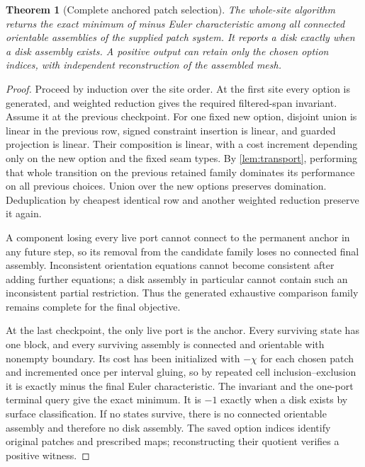 \documentclass[11pt,letterpaper]{article}
\newtheorem{theorem}{Theorem}[section]
\theoremstyle{definition}
\begin{document}
\begin{theorem}[Complete anchored patch selection]\label{thm:patch-algorithm}
The whole-site algorithm returns the exact minimum of minus Euler characteristic among all connected orientable assemblies of the supplied patch system. It reports a disk exactly when a disk assembly exists. A positive output can retain only the chosen option indices, with independent reconstruction of the assembled mesh.
\end{theorem}
\begin{proof}
Proceed by induction over the site order. At the first site every option is generated, and weighted reduction gives the required filtered-span invariant. Assume it at the previous checkpoint. For one fixed new option, disjoint union is linear in the previous row, signed constraint insertion is linear, and guarded projection is linear. Their composition is linear, with a cost increment depending only on the new option and the fixed seam types. By \cref{lem:transport}, performing that whole transition on the previous retained family dominates its performance on all previous choices. Union over the new options preserves domination. Deduplication by cheapest identical row and another weighted reduction preserve it again.

A component losing every live port cannot connect to the permanent anchor in any future step, so its removal from the candidate family loses no connected final assembly. Inconsistent orientation equations cannot become consistent after adding further equations; a disk assembly in particular cannot contain such an inconsistent partial restriction. Thus the generated exhaustive comparison family remains complete for the final objective.

At the last checkpoint, the only live port is the anchor. Every surviving state has one block, and every surviving assembly is connected and orientable with nonempty boundary. Its cost has been initialized with $-\chi$ for each chosen patch and incremented once per interval gluing, so by repeated cell inclusion--exclusion it is exactly minus the final Euler characteristic. The invariant and the one-port terminal query give the exact minimum. It is $-1$ exactly when a disk exists by surface classification. If no states survive, there is no connected orientable assembly and therefore no disk assembly. The saved option indices identify original patches and prescribed maps; reconstructing their quotient verifies a positive witness.
\end{proof}
\end{document}
